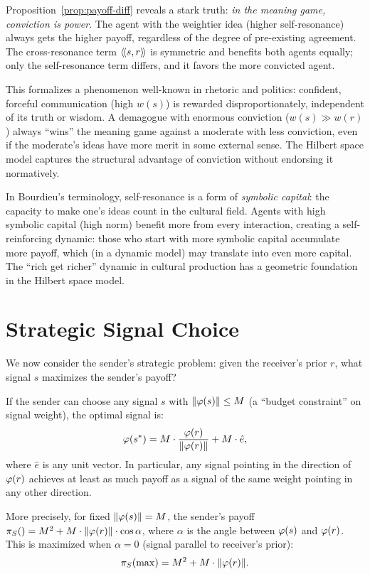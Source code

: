 \begin{interpretation}
\label{interp:conviction-advantage}
Proposition~\ref{prop:payoff-diff} reveals a stark truth: \emph{in the meaning
game, conviction is power}. The agent with the weightier idea (higher
self-resonance) always gets the higher payoff, regardless of the degree of
pre-existing agreement. The cross-resonance term $\langle\!\langle s, r \rangle\!\rangle$ is symmetric
and benefits both agents equally; only the self-resonance term differs, and it
favors the more convicted agent.

This formalizes a phenomenon well-known in rhetoric and politics: confident,
forceful communication (high $w(s)$) is rewarded disproportionately, independent
of its truth or wisdom. A demagogue with enormous conviction ($w(s) \gg w(r)$)
always ``wins'' the meaning game against a moderate with less conviction, even if
the moderate's ideas have more merit in some external sense. The Hilbert space
model captures the structural advantage of conviction without endorsing it
normatively.

In Bourdieu's terminology, self-resonance is a form of \emph{symbolic capital}:
the capacity to make one's ideas count in the cultural field. Agents with high
symbolic capital (high norm) benefit more from every interaction, creating a
self-reinforcing dynamic: those who start with more symbolic capital
accumulate more payoff, which (in a dynamic model) may translate into even
more capital. The ``rich get richer'' dynamic in cultural production has a
geometric foundation in the Hilbert space model.
\end{interpretation}


\section{Strategic Signal Choice}

We now consider the sender's strategic problem: given the receiver's prior $r$,
what signal $s$ maximizes the sender's payoff?

\begin{theorem}
\label{thm:optimal-signal}
If the sender can choose any signal $s$ with $\lVert \varphi(s) \rVert \leq M$ (a
``budget constraint'' on signal weight), the optimal signal is:
\[
  \varphi(s^*) = M \cdot \frac{\varphi(r)}{\lVert \varphi(r) \rVert} + M \cdot \hat{e},
\]
where $\hat{e}$ is any unit vector. In particular, any signal pointing in the
direction of $\varphi(r)$ achieves at least as much payoff as a signal of the same
weight pointing in any other direction.

More precisely, for fixed $\lVert \varphi(s) \rVert = M$, the sender's payoff
$\pi_{S}() = M^2 + M \cdot \lVert \varphi(r) \rVert \cdot \cos\alpha$, where
$\alpha$ is the angle between $\varphi(s)$ and $\varphi(r)$. This is maximized
when $\alpha = 0$ (signal parallel to receiver's prior):
\[
  \pi_{S}(\max) = M^2 + M \cdot \lVert \varphi(r) \rVert.
\]
\end{theorem}

